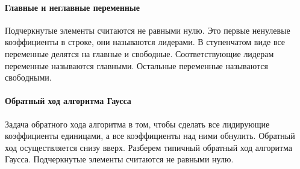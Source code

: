 \paragraph{Главные и неглавные переменные}

Подчеркнутые элементы считаются не равными нулю.
Это первые ненулевые коэффициенты в строке, они называются лидерами.
В ступенчатом виде все переменные делятся на главные и свободные.
Соответствующие лидерам переменные называются главными.
Остальные переменные называются свободными.

\paragraph{Обратный ход алгоритма Гаусса}

Задача обратного хода алгоритма в том, чтобы сделать все лидирующие коэффициенты единицами, а все коэффициенты над ними обнулить.
Обратный ход осуществляется снизу вверх.
Разберем типичный обратный ход алгоритма Гаусса.
Подчеркнутые элементы считаются не равными нулю.
